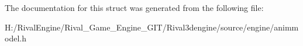 The documentation for this struct was generated from the following file\+:\begin{DoxyCompactItemize}
\item 
H\+:/\+Rival\+Engine/\+Rival\+\_\+\+Game\+\_\+\+Engine\+\_\+\+G\+I\+T/\+Rival3dengine/source/engine/animmodel.\+h\end{DoxyCompactItemize}
